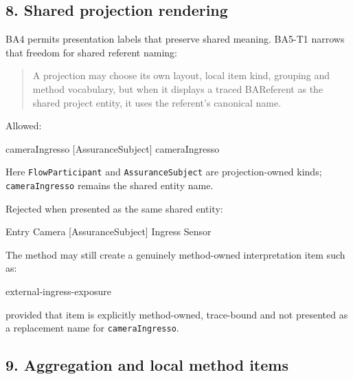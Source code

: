 \documentclass[
  10pt,
  a4paper,
]{article}
\newenvironment{Shaded}{}{}
\newcommand{\NormalTok}[1]{#1}
\begin{document}
\subsection{8. Shared projection
rendering}\label{shared-projection-rendering}

BA4 permits presentation labels that preserve shared meaning. BA5-T1
narrows that freedom for shared referent naming:

\begin{quote}
A projection may choose its own layout, local item kind, grouping and
method vocabulary, but when it displays a traced BAReferent as the
shared project entity, it uses the referent's canonical name.
\end{quote}

Allowed:

\begin{Shaded}
\begin{Highlighting}[]
\NormalTok{[FlowParticipant] cameraIngresso}
\NormalTok{[AssuranceSubject] cameraIngresso}
\end{Highlighting}
\end{Shaded}

Here \texttt{FlowParticipant} and \texttt{AssuranceSubject} are
projection-owned kinds; \texttt{cameraIngresso} remains the shared
entity name.

Rejected when presented as the same shared entity:

\begin{Shaded}
\begin{Highlighting}[]
\NormalTok{[FlowParticipant] Entry Camera}
\NormalTok{[AssuranceSubject] Ingress Sensor}
\end{Highlighting}
\end{Shaded}

The method may still create a genuinely method-owned interpretation item
such as:

\begin{Shaded}
\begin{Highlighting}[]
\NormalTok{external{-}ingress{-}exposure}
\end{Highlighting}
\end{Shaded}

provided that item is explicitly method-owned, trace-bound and not
presented as a replacement name for \texttt{cameraIngresso}.

\subsection{9. Aggregation and local method
items}\label{aggregation-and-local-method-items}
\end{document}
